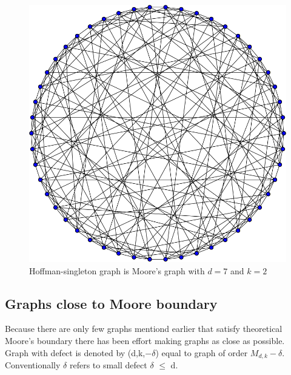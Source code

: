\documentclass[a4paper,11pt,twoside]{report}%
\begin{document}
\begin{figure}[!ht]
	\centering
	\includegraphics[scale=0.33]{Hoffman-Singleton_graph.png}
	\caption{Hoffman-singleton graph is Moore's graph with $d=7$ and $k=2$ }
\end{figure}



\subsection{Graphs close to Moore boundary}
Because there are only few graphs mentiond earlier that satisfy theoretical Moore's boundary there has been effort making graphs as close as possible. Graph with defect is denoted by (d,k,$-\delta$) equal to graph of order $M_{d,k}-\delta$. Conventionally $\delta$ refers to small defect $\delta$ $\leq$ d. 
\end{document}
